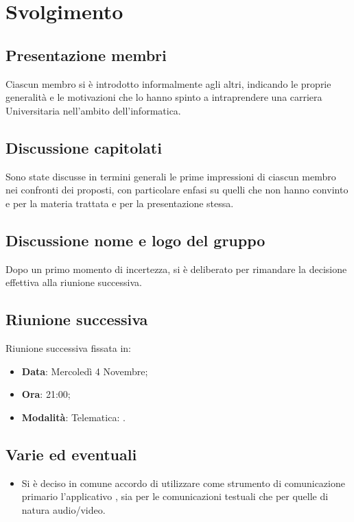 \documentclass[]{article}
\begin{document}
	\newpage

	\section{Svolgimento}
		\subsection{Presentazione membri}
		Ciascun membro si è introdotto informalmente agli altri, indicando le proprie generalità e le motivazioni che lo hanno spinto a intraprendere una carriera Universitaria nell'ambito dell'informatica.\\
	
		\subsection{Discussione capitolati}
		Sono state discusse in termini generali le prime impressioni di ciascun membro nei confronti dei  proposti, con particolare enfasi su quelli che non hanno convinto e per la materia trattata e per la presentazione stessa.\\
	
		\subsection{Discussione nome e logo del gruppo}
		Dopo un primo momento di incertezza, si è deliberato per rimandare la decisione effettiva alla riunione successiva.\\
	
		\subsection{Riunione successiva}
		Riunione successiva fissata in:
		\begin{itemize}
			\item \textbf{Data}: Mercoledì 4 Novembre;
			\item \textbf{Ora}: 21:00;
			\item \textbf{Modalità}: Telematica: .\\
		\end{itemize}
	
		\subsection{Varie ed eventuali}
		\begin{itemize}
			\item Si è deciso in comune accordo di utilizzare come strumento di comunicazione primario l'applicativo , sia per le comunicazioni testuali che per quelle di natura audio/video.
		\end{itemize}
	
\end{document}
